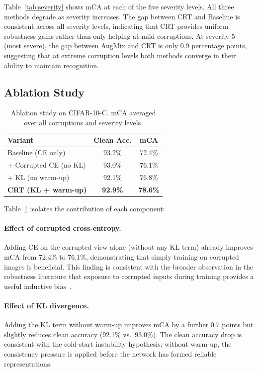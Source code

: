 \documentclass[10pt,twocolumn]{article}
\begin{document}
Table~\ref{tab:severity} shows mCA at each of the five severity levels. All three methods degrade as severity increases. The gap between CRT and Baseline is consistent across all severity levels, indicating that CRT provides uniform robustness gains rather than only helping at mild corruptions. At severity 5 (most severe), the gap between AugMix and CRT is only 0.9 percentage points, suggesting that at extreme corruption levels both methods converge in their ability to maintain recognition.

\subsection{Ablation Study}

\begin{table}[t]
\centering
\caption{Ablation study on CIFAR-10-C. mCA averaged over all corruptions and severity levels.}
\label{tab:ablation}
\begin{tabular}{lcc}
\toprule
\textbf{Variant} & \textbf{Clean Acc.} & \textbf{mCA} \\
\midrule
Baseline (CE only)              & 93.2\%              & 72.4\%       \\
$+$ Corrupted CE (no KL)        & 93.0\%              & 76.1\%       \\
$+$ KL (no warm-up)             & 92.1\%              & 76.8\%       \\
\textbf{CRT (KL + warm-up)}     & \textbf{92.9\%}     & \textbf{78.6\%} \\
\bottomrule
\end{tabular}
\end{table}

Table~\ref{tab:ablation} isolates the contribution of each component:

\paragraph{Effect of corrupted cross-entropy.} Adding CE on the corrupted view alone (without any KL term) already improves mCA from 72.4\% to 76.1\%, demonstrating that simply training on corrupted images is beneficial. This finding is consistent with the broader observation in the robustness literature that exposure to corrupted inputs during training provides a useful inductive bias~\cite{erichson2024noisymix,kumar2026demhec}.

\paragraph{Effect of KL divergence.} Adding the KL term without warm-up improves mCA by a further 0.7 points but slightly reduces clean accuracy (92.1\% vs.\ 93.0\%). The clean accuracy drop is consistent with the cold-start instability hypothesis: without warm-up, the consistency pressure is applied before the network has formed reliable representations.
\end{document}
